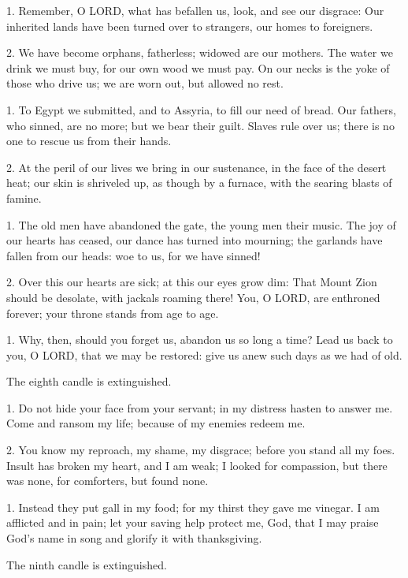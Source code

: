 
1. Remember, O LORD, what has befallen us, look, and see our disgrace: Our
inherited lands have been turned over to strangers, our homes to foreigners.

2. We have become orphans, fatherless; widowed are our mothers. The water we
drink we must buy, for our own wood we must pay. On our necks is the yoke of
those who drive us; we are worn out, but allowed no rest.

1. To Egypt we submitted, and to Assyria, to fill our need of bread. Our
fathers, who sinned, are no more; but we bear their guilt. Slaves rule over us;
there is no one to rescue us from their hands.

2. At the peril of our lives we bring in our sustenance, in the face of the
desert heat; our skin is shriveled up, as though by a furnace, with the searing
blasts of famine.

1. The old men have abandoned the gate, the young men their music. The joy of
our hearts has ceased, our dance has turned into mourning; the garlands have
fallen from our heads: woe to us, for we have sinned!

2. Over this our hearts are sick; at this our eyes grow dim: That Mount Zion
should be desolate, with jackals roaming there! You, O LORD, are enthroned
forever; your throne stands from age to age.

1. Why, then, should you forget us, abandon us so long a time? Lead us back to
you, O LORD, that we may be restored: give us anew such days as we had of old.



\begin{rubric}
  The eighth candle is extinguished.
\end{rubric}




1. Do not hide your face from your servant; in my distress hasten to answer me.
Come and ransom my life; because of my enemies redeem me.

2. You know my reproach, my shame, my disgrace; before you stand all my foes.
Insult has broken my heart, and I am weak; I looked for compassion, but there
was none, for comforters, but found none.

1. Instead they put gall in my food; for my thirst they gave me vinegar. I am
afflicted and in pain; let your saving help protect me, God, that I may praise
God's name in song and glorify it with thanksgiving.

\begin{rubric}
  The ninth candle is extinguished.
\end{rubric}



